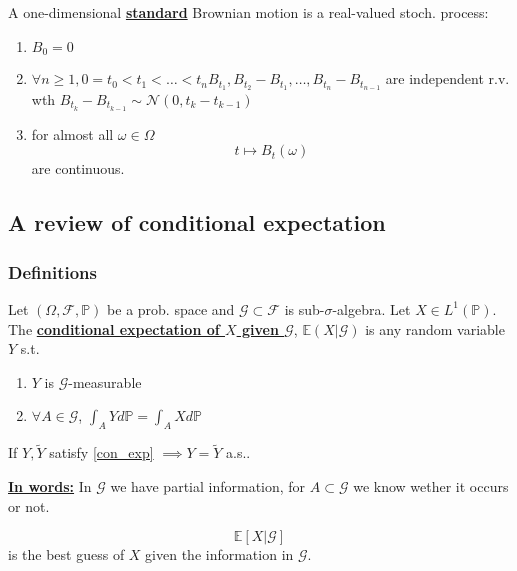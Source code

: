 

\begin{*definition}%
    A one-dimensional \underline{\textbf{standard}} Brownian motion is a real-valued stoch. process:
    \begin{enumerate}
        \item $B_0=0$
        \item $\forall n\geq 1,0=t_0<t_1<\dots<t_n B_{t_1},B_{t_2}-B_{t_1},\dots,B_{t_n}-B_{t_{n-1}}$ are independent r.v. wth $B_{t_k}-B_{t_{k-1}}\sim \mathcal{N}(0,t_k-t_{k-1})$
        \item for almost all $\omega\in \Omega$\[t\mapsto B_t(\omega)\] are continuous.
    \end{enumerate}
\end{*definition}

\subsection{A review of conditional expectation}

\subsubsection{Definitions}

\begin{definition}\label{con_exp}
    Let $(\Omega,\mathcal{F},\mathbb{P})$ be a prob. space and $\mathcal{G}\subset \mathcal{F}$ is sub-$\sigma$-algebra.
    Let $X\in L^1(\mathbb{P})$. The \underline{\textbf{conditional expectation of $X$ given $\mathcal{G}$}}, $\mathbb{E}(X|\mathcal{G})$ is any random
    variable $Y$ s.t.
    \begin{enumerate}
        \item $Y$ is $\mathcal{G}$-measurable
        \item $\forall A\in \mathcal{G}$, $\int_A Yd\mathbb{P}=\int_A X d\mathbb{P}$
    \end{enumerate}
\end{definition}

\begin{remark}
    If $Y,\tilde{Y}$ satisfy \ref{con_exp} $\implies Y=\tilde{Y}$ a.s..
\end{remark}
\underline{\textbf{In words:}} In $\mathcal{G}$ we have partial information,
for $A\subset \mathcal{G}$ we know wether it occurs or not.

$$\mathbb{E}[X|\mathcal{G}]$$ is the best guess of $X$ given the information in $\mathcal{G}$.

